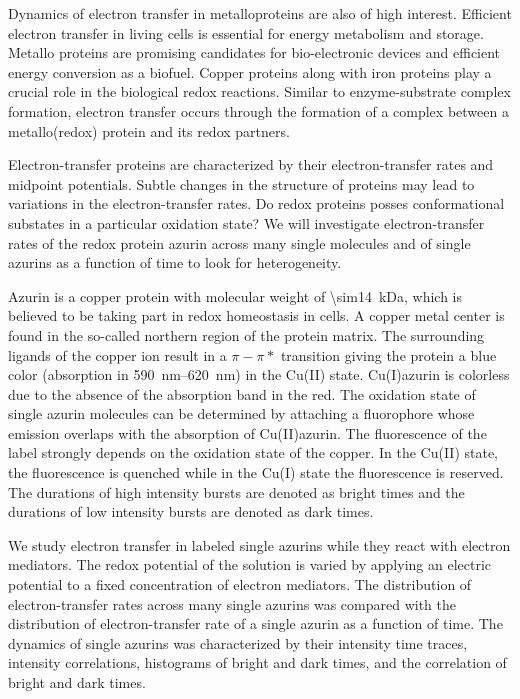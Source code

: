 Dynamics of electron transfer in metalloproteins are also of high interest.\cite{marcus1985electron,dooley1981spectroscopic}
Efficient electron transfer in living cells is essential for energy metabolism and storage.
Metallo proteins are promising candidates for bio-electronic devices and efficient energy conversion as a biofuel.
Copper proteins along with iron proteins play a crucial role in the biological redox reactions. \cite{solomon2004electronic,solomon2001oxygen,peisach1974structural,canters1993engineering} 
Similar to enzyme-substrate complex formation, electron transfer occurs through the formation of a complex between a metallo(redox) protein and its redox partners.


Electron-transfer proteins are characterized by their electron-transfer rates and midpoint potentials.
Subtle changes in the structure of proteins may lead to variations in the electron-transfer rates.
Do redox proteins posses conformational substates in a particular oxidation state?
We will investigate electron-transfer rates of the redox protein azurin across many single molecules and of single azurins as a function of time to look for heterogeneity.


Azurin is a copper protein  with molecular weight of \SI{\sim14}{\kilo\dalton}, which is believed to be taking part in redox homeostasis in cells.
A copper metal center is found in the so-called northern region of the protein matrix.
The surrounding ligands of the copper ion result in a $\pi-\pi*$ transition giving the protein a blue color (absorption in \SIrange{590}{620}{\nm}) in the Cu(II) state.
Cu(I)azurin is colorless due to the absence of the absorption band in the red.
The oxidation state of single azurin molecules can be determined by attaching a fluorophore whose emission overlaps with the absorption of Cu(II)azurin.\cite{kuznetsova2006a,kuznetsova2008the}
The fluorescence of the label strongly depends on the oxidation state of the copper.
In the Cu(II) state, the fluorescence is quenched while in the Cu(I) state the fluorescence is reserved.
The durations of high intensity bursts are denoted as bright times and the durations of low intensity bursts are denoted as dark times.


We study electron transfer in labeled single azurins while they react with electron mediators.
The redox potential of the solution is varied by applying an electric potential to a fixed concentration of electron mediators.
The distribution of electron-transfer rates across many single azurins was compared with the distribution of electron-transfer rate of a single azurin as a function of time.
The dynamics of single azurins was characterized by their intensity time traces, intensity correlations, histograms of bright and dark times, and the correlation of bright and dark times.

